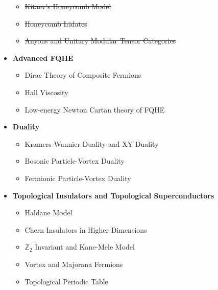 \documentclass[10pt,nofootinbib]{revtex4}
\begin{document}
\begin{itemize}[label=$\circ$]
		\begin{itemize}[label=$\star$]
			\item \sout{{\color{red}Kitaev's Honeycomb Model \mbox{\cite{kitaev2006anyons}}}}
			\item \sout{Honeycomb Iridates \mbox{\cite{jackeli2009mott,rau2014generic}}}
			\item \sout{Anyons and Unitary Modular Tensor Categories \mbox{\cite{kitaev2006anyons,beer2018categories}}}
		\end{itemize}
	\item {\bf Advanced FQHE}
		\begin{itemize}[label=$\star$]
			\item Dirac Theory of Composite Fermions \cite{son2015composite}
			\item Hall Viscosity \cite{hoyos2012hall}
			\item Low-energy Newton Cartan theory of FQHE \cite{dubovsky2012effective,geracie2015spacetime}
		\end{itemize}
	\item {\bf Duality}
		\begin{itemize}[label=$\star$]
			\item Kramers-Wannier Duality and XY Duality \cite{kogut1979introduction,savit1980duality,Sachdev-Z2Duality,Sachdev-Z2Gauge,Sachdev-XYDuality}
			\item Bosonic Particle-Vortex Duality \cite{lee1989anyon,senthil2004deconfined}
			\item Fermionic Particle-Vortex Duality \cite{son2015composite,wang2015dual,seiberg2016duality,karch2016particle,Senthilslides}
		\end{itemize}
	\item {\bf Topological Insulators and Topological Superconductors}
		\begin{itemize}[label=$\star$]
			\item Haldane Model \cite{fruchart2013introduction,bernevig2013topological,witten2015three}
			\item Chern Insulators in Higher Dimensions \cite{bernevig2013topological}
			\item $\mathbb{Z}_2$ Invariant and Kane-Mele Model \cite{fruchart2013introduction,bernevig2013topological,witten2015three}
			\item Vortex and Majorana Fermions \cite{kitaev2001unpaired,alicea2012new}
			\item Topological Periodic Table \cite{kitaev2009periodic,Ashvin-PCCM}
		\end{itemize}

\end{itemize}
\end{document}
